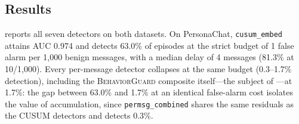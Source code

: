 \documentclass[conference]{IEEEtran}
\newcommand{\BG}{\textsc{BehaviorGuard}}
\begin{document}
\subsection{Results}
\label{sec:cusum:results}

 reports all seven detectors on both datasets.
On PersonaChat, \texttt{cusum\_embed} attains AUC 0.974 and detects 63.0\% of
episodes at the strict budget of 1 false alarm per 1{,}000 benign messages, with a
median delay of 4 messages (81.3\% at 10/1{,}000).
Every per-message detector collapses at the same budget (0.3--1.7\% detection),
including the \BG{} composite itself---the subject of ---at
1.7\%: the gap between 63.0\% and 1.7\% at an identical false-alarm cost isolates
the value of accumulation, since \texttt{permsg\_combined} shares the same
residuals as the CUSUM detectors and detects 0.3\%.
\end{document}
